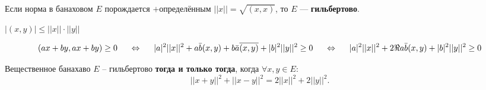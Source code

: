 \begin{to_def}
	Если норма в банаховом $E$ порождается $+$определённым $||x|| = \sqrt{(x,x)}$, то $E$ --- \textbf{гильбертово}. 
\end{to_def}

\begin{to_thr}
	$|(x,y)| \leq ||x|| \cdot ||y||$
		
	\begin{equation*}
		(ax + by, ax + by) \geq 0 
		\hspace{0.5 cm}
		\Leftrightarrow
		\hspace{0.5 cm}
		|a|^2 ||x||^2 + a \bar{b} (x,y) + b \bar{a} \overline{(x,y)} + |b|^2 ||y||^2 \geq 0
		\hspace{0.5 cm}
		\Leftrightarrow
		\hspace{0.5 cm}
		|a|^2 ||x||^2 + 2 \Re a \bar{b} (x,y) + |b|^2 ||y||^2 \geq 0
	\end{equation*}
\end{to_thr}

\begin{to_thr}
	Вещественное банахаво $E$ -- гильбертово \textbf{тогда и только тогда}, когда $\forall x,y \in E$:
	\begin{equation*}
		||x+y||^2 + ||x-y||^2 = 2 ||x||^2 + 2 ||y||^2.
	\end{equation*}
\end{to_thr}